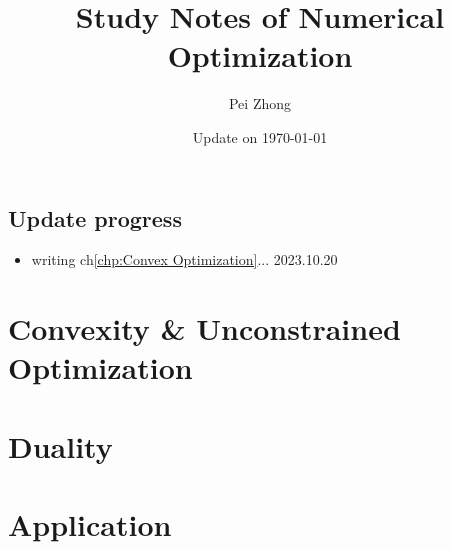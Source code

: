 \documentclass[12pt,oneside]{book} %
\begin{document}
\title{\bf \huge Study Notes of Numerical Optimization}
\author{Pei Zhong}
\date{Update on \today}

\maketitle


\tableofcontents

\begin{spacing}{1}

\chapter*{Update progress}
\begin{itemize}
    \item {writing ch\ref{chp:Convex Optimization}... \hfill 2023.10.20}
\end{itemize}









\part{Convexity \& Unconstrained Optimization}














\part{Duality}

\part{Application}




\end{spacing}
\end{document}
